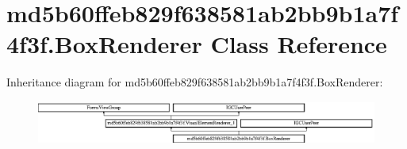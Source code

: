 \hypertarget{classmd5b60ffeb829f638581ab2bb9b1a7f4f3f_1_1BoxRenderer}{}\section{md5b60ffeb829f638581ab2bb9b1a7f4f3f.\+Box\+Renderer Class Reference}
\label{classmd5b60ffeb829f638581ab2bb9b1a7f4f3f_1_1BoxRenderer}
Inheritance diagram for md5b60ffeb829f638581ab2bb9b1a7f4f3f.\+Box\+Renderer\+:\begin{figure}[H]
\begin{center}
\leavevmode
\includegraphics[height=1.403509cm]{classmd5b60ffeb829f638581ab2bb9b1a7f4f3f_1_1BoxRenderer}
\end{center}
\end{figure}
